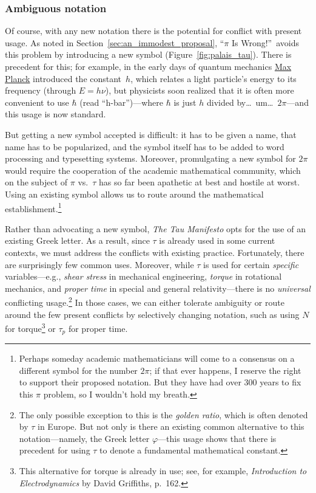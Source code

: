 {    \subsubsection{Ambiguous notation} %
    \label{sec:ambiguous_notation}


Of course, with any new notation there is the potential for conflict with present usage. As noted in Section~\ref{sec:an_immodest_proposal}, ``$\pi$ Is Wrong!''\ avoids this problem by introducing a new symbol (Figure~\ref{fig:palais_tau}). There is precedent for this; for example, in the early days of quantum mechanics \href{https://en.wikipedia.org/wiki/Max_Planck}{Max Planck} introduced the constant~$h$, which relates a light particle's energy to its frequency (through $E = h\nu$), but physicists soon realized that it is often more convenient to use $\hbar$ (read ``h-bar'')---where $\hbar$ is just $h$ divided by\ldots\ um\ldots\ $2\pi$---and this usage is now standard.

But getting a new symbol accepted is difficult: it has to be given a name, that name has to be popularized, and the symbol itself has to be added to word processing and typesetting systems. Moreover, promulgating a new symbol for $2\pi$ would require the cooperation of the academic mathematical community, which on the subject of $\pi$ vs.\ $\tau$ has so far been apathetic at best and hostile at worst. Using an existing symbol allows us to route around the mathematical establishment.\footnote{Perhaps someday academic mathematicians will come to a consensus on a different symbol for the number $2\pi$; if that ever happens, I reserve the right to support their proposed notation. But they have had over 300 years to fix this $\pi$ problem, so I wouldn't hold my breath.}

Rather than advocating a new symbol, \emph{The Tau Manifesto} opts for the use of an existing Greek letter. As a result, since $\tau$ is already used in some current contexts, we must address the conflicts with existing practice. Fortunately, there are surprisingly few common uses. Moreover, while $\tau$ is used for certain \emph{specific} variables---e.g., \emph{shear stress} in mechanical engineering, \emph{torque} in rotational mechanics, and \emph{proper time} in special and general relativity---there is no \emph{universal} conflicting usage.\footnote{The only possible exception to this is the \emph{golden ratio}, which is often denoted by $\tau$ in Europe. But not only is there an existing common alternative to this notation---namely, the Greek letter $\varphi$---this usage shows that there is precedent for using $\tau$ to denote a fundamental mathematical constant.} In those cases, we can either tolerate ambiguity or route around the few present conflicts by selectively changing notation, such as using $N$ for torque\footnote{This alternative for torque is already in use; see, for example, \emph{Introduction to Electrodynamics} by David Griffiths, p.~162.} or $\tau_p$ for proper time.

}
